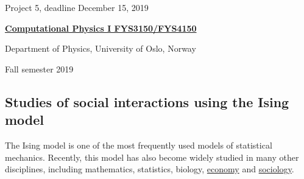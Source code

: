 \documentclass[%
oneside,                 %
final,                   %
10pt]{article}
\begin{document}

\newcommand{\exercisesection}[1]{\subsection*{#1}}






\thispagestyle{empty}

\begin{center}
{\LARGE\bf
\begin{spacing}{1.25}
Project 5, deadline  December 15, 2019
\end{spacing}
}
\end{center}


\begin{center}
{\bf \href{{http://www.uio.no/studier/emner/matnat/fys/FYS3150/index-eng.html}}{Computational Physics I FYS3150/FYS4150}}
\end{center}

    \begin{center}
\centerline{{\small Department of Physics, University of Oslo, Norway}}
\end{center}
    

\begin{center}
Fall semester 2019
\end{center}

\vspace{1cm}


\subsection*{Studies of social interactions using the Ising model}

The Ising model is one of the most
frequently used models of statistical mechanics. Recently, this
model has also become widely studied in many other disciplines, including mathematics, statistics, biology, \href{{https://www.springer.com/gp/book/9783319477046}}{economy} and \href{{https://www.springer.com/gp/book/9781461420316}}{sociology}.
\end{document}
